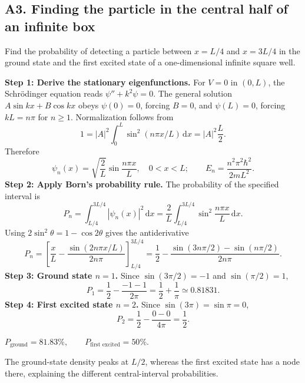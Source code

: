 \documentclass[11pt,a4paper]{article}
\newcommand{\key}[1]{\begin{resultbox}\centering\(\displaystyle #1\)\end{resultbox}}
\newcommand{\dd}{\mathrm{d}}
\newcommand{\Sch}{Schr\"odinger}
\newcommand{\abs}[1]{\left|#1\right|}
\begin{document}
\subsection{A3. Finding the particle in the central half of an infinite box}
\begin{questionbox}
Find the probability of detecting a particle between $x=L/4$ and $x=3L/4$ in the ground state and the first excited state of a one-dimensional infinite square well.
\end{questionbox}
\textbf{Step 1: Derive the stationary eigenfunctions.} For $V=0$ in $(0,L)$, the \Sch{} equation reads $\psi''+k^2\psi=0$. The general solution $A\sin kx+B\cos kx$ obeys $\psi(0)=0$, forcing $B=0$, and $\psi(L)=0$, forcing $kL=n\pi$ for $n\geq1$. Normalization follows from
\begin{equation}
1=\abs{A}^2\int_0^L\sin^2(n\pi x/L)\,\dd x=\abs A^2\frac L2.
\end{equation}
Therefore
\begin{equation}
\psi_n(x)=\sqrt{\frac2L}\sin\frac{n\pi x}{L},\quad 0<x<L;\qquad E_n=\frac{n^2\pi^2\hbar^2}{2mL^2}.
\end{equation}
\textbf{Step 2: Apply Born's probability rule.} The probability of the specified interval is
\begin{equation}
P_n=\int_{L/4}^{3L/4}\abs{\psi_n(x)}^2\,\dd x=\frac2L\int_{L/4}^{3L/4}\sin^2\frac{n\pi x}{L}\,\dd x.
\end{equation}
Using $2\sin^2\theta=1-\cos 2\theta$ gives the antiderivative
\begin{equation}
P_n=\left[\frac{x}{L}-\frac{\sin(2n\pi x/L)}{2n\pi}\right]_{L/4}^{3L/4}
=\frac12-\frac{\sin(3n\pi/2)-\sin(n\pi/2)}{2n\pi}.
\end{equation}
\textbf{Step 3: Ground state $n=1$.} Since $\sin(3\pi/2)=-1$ and $\sin(\pi/2)=1$,
\begin{equation}
P_1=\frac12-\frac{-1-1}{2\pi}=\boxed{\frac12+\frac1\pi\simeq0.81831}.
\end{equation}
\textbf{Step 4: First excited state $n=2$.} Since $\sin(3\pi)=\sin\pi=0$,
\begin{equation}
P_2=\frac12-\frac{0-0}{4\pi}=\boxed{\frac12}.
\end{equation}
\key{\boxed{P_{\text{ground}}=81.83\%,\qquad P_{\text{first excited}}=50\%.}}
The ground-state density peaks at $L/2$, whereas the first excited state has a node there, explaining the different central-interval probabilities.
\end{document}
